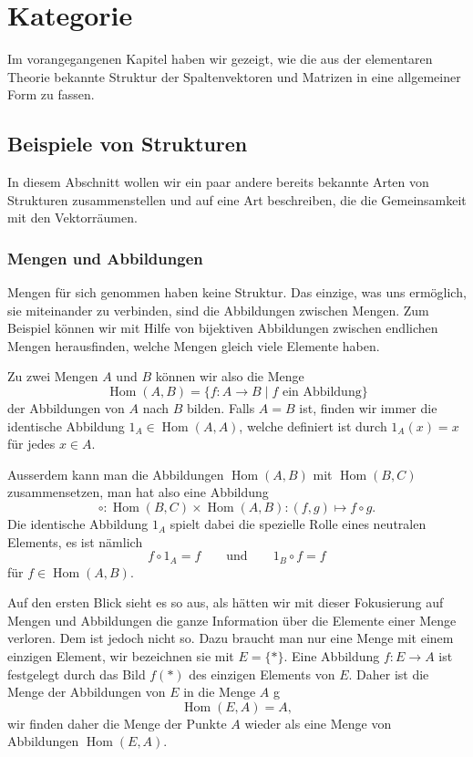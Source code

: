 %
%
%
\chapter{Kategorie}
Im vorangegangenen Kapitel haben wir gezeigt, wie die aus der
elementaren Theorie bekannte Struktur der Spaltenvektoren und
Matrizen in eine allgemeiner Form zu fassen.

\section{Beispiele von Strukturen}
In diesem Abschnitt wollen wir ein paar andere bereits bekannte
Arten von Strukturen zusammenstellen und auf eine Art beschreiben,
die die Gemeinsamkeit mit den Vektorräumen.

\subsection{Mengen und Abbildungen}
Mengen für sich genommen haben keine Struktur.
Das einzige, was uns ermöglich, sie miteinander zu verbinden, sind die
Abbildungen zwischen Mengen.
Zum Beispiel können wir mit Hilfe von bijektiven Abbildungen zwischen
endlichen Mengen herausfinden, welche Mengen gleich viele Elemente haben.

Zu zwei Mengen $A$ und $B$ können wir also die Menge 
\[
\operatorname{Hom}(A,B)
=
\{ f\colon A\to B\;|\; \text{$f$ ein Abbildung}\}
\]
der Abbildungen von $A$ nach $B$ bilden.
Falls $A=B$ ist, finden wir immer die identische Abbildung
$1_{A}\in \operatorname{Hom}(A,A)$, welche definiert ist durch
$1_A(x)=x$
für jedes $x\in A$.

Ausserdem kann man die Abbildungen
$\operatorname{Hom}(A,B)$
mit
$\operatorname{Hom}(B,C)$
zusammensetzen, man hat also eine Abbildung
\[
\circ
\colon
\operatorname{Hom}(B,C)
\times
\operatorname{Hom}(A,B)
:
(f,g)
\mapsto
f\circ g.
\]
Die identische Abbildung $1_A$ spielt dabei die spezielle Rolle eines
neutralen Elements,
es ist nämlich
\[
f\circ 1_A
=
f
\qquad\text{und}\qquad
1_B \circ f = f
\]
für $f\in\operatorname{Hom}(A,B)$.

Auf den ersten Blick sieht es so aus, als hätten wir mit dieser Fokusierung
auf Mengen und Abbildungen die ganze Information über die Elemente einer Menge
verloren.
Dem ist jedoch nicht so.
Dazu braucht man nur eine Menge mit einem einzigen Element, wir bezeichnen
sie mit $E=\{*\}$.
Eine Abbildung $f\colon E\to A$ ist festgelegt durch das Bild $f(*)$
des einzigen Elements von $E$.
Daher ist die Menge der Abbildungen von $E$ in die Menge $A$ g
\[
\operatorname{Hom}(E,A)
=
A,
\]
wir finden daher die Menge der Punkte $A$ wieder als eine Menge von
Abbildungen $\operatorname{Hom}(E,A)$.

